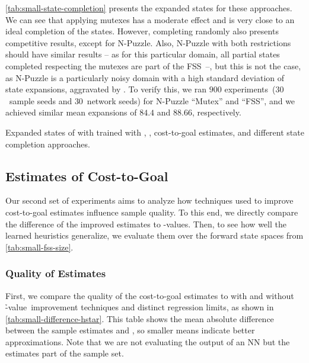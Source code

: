 \cref{tab:small-state-completion} presents the expanded states for these approaches. We can see that applying mutexes has a moderate effect and is very close to an ideal completion of the states. However, completing randomly also presents competitive results, except for N-Puzzle. Also, N-Puzzle with both restrictions should have similar results -- as for this particular domain, all partial states completed respecting the mutexes are part of the FSS~--, but this is not the case, as N-Puzzle is a particularly noisy domain with a high standard deviation of state expansions, aggravated by \gbfs. To verify this, we ran $900$ experiments~($30$~sample seeds and $30$~network seeds) for N-Puzzle ``Mutex'' and ``FSS'', and we achieved similar mean expansions of $84.4$ and $88.66$, respectively.

\begin{table}[ht]
    \caption[Expanded states from different state completion approaches.]{Expanded states of \gbfs with \hnn trained with \bfsrw, \rlmeanfx, \hstar cost-to-goal estimates, and different state completion approaches.}
    \label{tab:small-state-completion}
    \addmargin
    \centering
    
\end{table}

\subsection{Estimates of Cost-to-Goal}
\label{sec:small-exps-hvalue}

Our second set of experiments aims to analyze how techniques used to improve cost-to-goal estimates influence sample quality. To this end, we directly compare the difference of the improved estimates to \hstar-values. Then, to see how well the learned heuristics generalize, we evaluate them over the forward state spaces from \cref{tab:small-fss-size}.

\subsubsection{Quality of Estimates}
\label{sec:small-exps-hvalue-quality}

First, we compare the quality of the cost-to-goal estimates to \hstar with and without \h-value~improvement techniques and distinct regression limits, as shown in \cref{tab:small-difference-hstar}. This table shows the mean absolute difference between the sample estimates and \hstar, so smaller means indicate better approximations. Note that we are not evaluating the output of an NN but the estimates part of the sample set.

